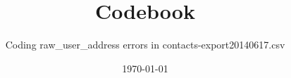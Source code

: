 \documentclass[12pt]{article}
\begin{document}

\linespread{1}

\title{Codebook}
\author{Coding raw\_user\_address errors in contacts-export20140617.csv}
\date{\today}

\maketitle
\end{document}
